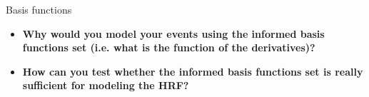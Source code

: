 \documentclass{beamer}
\begin{document}
% 
% 
% 


\begin{frame}{Basis functions}
  \begin{itemize}
    \item \textbf{Why would you model your events using the informed basis functions set (i.e. what is the function of the derivatives)?}


    \bigskip       
    \item \textbf{How can you test whether the informed basis functions set is really sufficient for modeling the HRF?}

  \end{itemize}
\end{frame}
\end{document}

